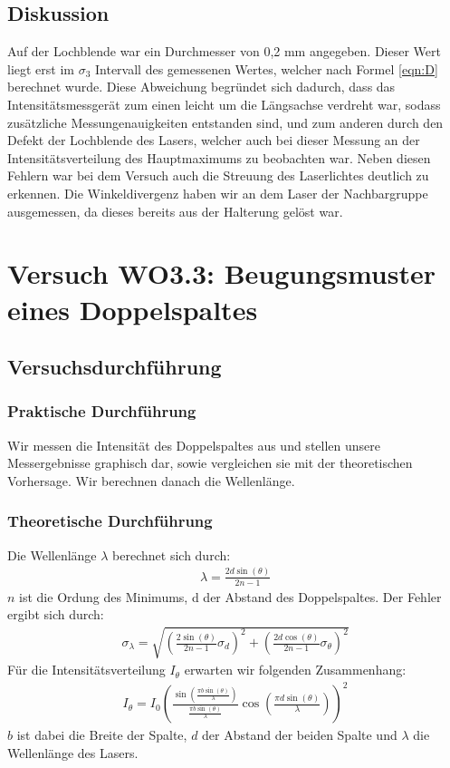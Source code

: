 \documentclass[12pt]{scrartcl}
\begin{document}

\subsection{Diskussion}
Auf der Lochblende war ein Durchmesser von 0,2 mm angegeben. Dieser Wert liegt erst im $\sigma_3$ Intervall des gemessenen Wertes, welcher nach Formel \ref{eqn:D} berechnet wurde. Diese Abweichung begründet sich dadurch, dass das Intensitätsmessgerät zum einen leicht um die
Längsachse verdreht war, sodass zusätzliche Messungenauigkeiten entstanden sind, und zum anderen durch den Defekt der Lochblende des Lasers, welcher auch bei dieser Messung an der Intensitätsverteilung des Hauptmaximums zu beobachten war. Neben diesen Fehlern war bei dem Versuch auch die Streuung des Laserlichtes deutlich zu erkennen.
Die Winkeldivergenz haben wir an dem Laser der Nachbargruppe ausgemessen, da dieses bereits aus der Halterung gelöst war.

\section{Versuch WO3.3: Beugungsmuster eines Doppelspaltes}
\subsection{Versuchsdurchführung}

\subsubsection{Praktische Durchführung}
Wir messen die Intensität des Doppelspaltes aus und stellen unsere Messergebnisse graphisch dar, sowie vergleichen sie mit der theoretischen Vorhersage. Wir berechnen danach die Wellenlänge.
\subsubsection{Theoretische Durchführung}
Die Wellenlänge $\lambda$ berechnet sich durch:
\begin{align}
\lambda = \frac{2d \sin(\theta)}{2n-1}
\label{eqn:lambda_2}
\end{align}
$n$ ist die Ordung des Minimums, d der Abstand des Doppelspaltes.
Der Fehler ergibt sich durch:
\begin{align}
\sigma_\lambda = \sqrt{
\left(\frac{2 \sin(\theta)}{2n-1}\sigma_d\right)^2+
\left(\frac{2d \cos(\theta)}{2n-1}\sigma_\theta\right)^2}
\label{eqn:lambda_2_sigma}
\end{align}
Für die Intensitätsverteilung $I_\theta$ erwarten wir folgenden Zusammenhang:
\begin{align}
I_\theta = I_0\left(\frac{\sin\left(\frac{\pi b \sin(\theta)}{\lambda}\right)}{\frac{\pi b \sin(\theta)}{\lambda}}\cos\left(\frac{\pi d\sin(\theta)}{\lambda}\right)\right)^2
\label{eqn:I_theta_Doppelspalt}
\end{align}
$b$ ist dabei die Breite der Spalte, $d$ der Abstand der beiden Spalte und $\lambda$ die Wellenlänge des Lasers.
\end{document}
